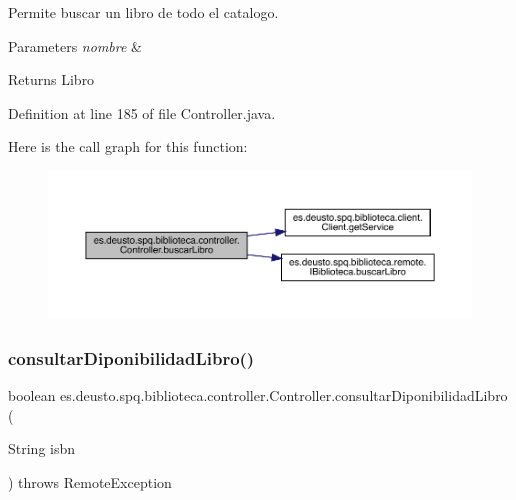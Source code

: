 Permite buscar un libro de todo el catalogo. 
\begin{DoxyParams}{Parameters}
{\em nombre} & \\
\hline
\end{DoxyParams}
\begin{DoxyReturn}{Returns}
Libro 
\end{DoxyReturn}


Definition at line 185 of file Controller.\+java.

Here is the call graph for this function\+:
\nopagebreak
\begin{figure}[H]
\begin{center}
\leavevmode
\includegraphics[width=350pt]{classes_1_1deusto_1_1spq_1_1biblioteca_1_1controller_1_1_controller_ade06ace92b16c4316cf098e1cd848960_cgraph}
\end{center}
\end{figure}
\mbox{\label{classes_1_1deusto_1_1spq_1_1biblioteca_1_1controller_1_1_controller_a56b80d08fca56676988e71f3abac0372}} 
\subsubsection{\texorpdfstring{consultar\+Diponibilidad\+Libro()}{consultarDiponibilidadLibro()}}
{\footnotesize\ttfamily boolean es.\+deusto.\+spq.\+biblioteca.\+controller.\+Controller.\+consultar\+Diponibilidad\+Libro (\begin{DoxyParamCaption}\item[{String}]{isbn }\end{DoxyParamCaption}) throws Remote\+Exception}

